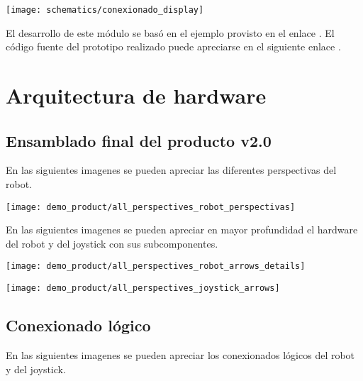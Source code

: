 \begin{center}
\texttt{[image: schematics/conexionado\_display]}
  \label{fig:conexionado_display}

\end{center}



El desarrollo de este módulo se basó en el ejemplo provisto en el enlace \cite{ESP32_Display_Example}. El código fuente del prototipo realizado puede apreciarse en el siguiente enlace \cite{ESP32_POC_display}.


\section{Arquitectura de hardware}


\subsection{Ensamblado final del producto v2.0}

En las siguientes imagenes se pueden apreciar las diferentes perspectivas del robot.

\begin{center}
\texttt{[image: demo\_product/all\_perspectives\_robot\_perspectivas]}
  \label{fig:conexionado_fisico}
\end{center}


En las siguientes imagenes se pueden apreciar en mayor profundidad el hardware del robot y del joystick con sus subcomponentes.

\begin{center}
\texttt{[image: demo\_product/all\_perspectives\_robot\_arrows\_details]}
  \label{fig:conexionado_fisico}
\end{center}

\begin{center}
\texttt{[image: demo\_product/all\_perspectives\_joystick\_arrows]}
  \label{fig:conexionado_fisico}
\end{center}


\subsection{Conexionado lógico }

En las siguientes imagenes se pueden apreciar los conexionados lógicos del robot y del joystick.

